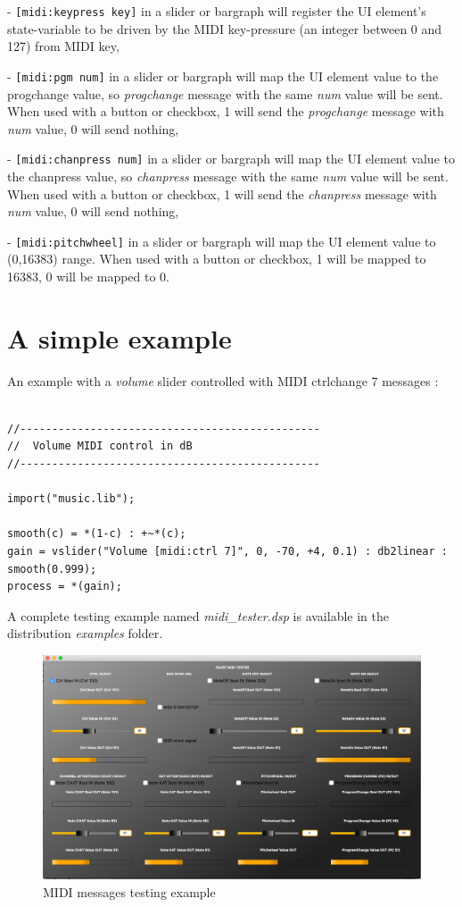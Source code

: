 - \lstinline'[midi:keypress key]' in a slider or bargraph will
register the UI element's state-variable to be driven by the MIDI
key-pressure (an integer between 0 and 127) from MIDI key,

- \lstinline'[midi:pgm num]' in a slider or bargraph will map the UI element value to the progchange value, so \emph{progchange} message with the same \emph{num} value will be sent. When used with a button or checkbox, 1 will send the \emph{progchange} message with \emph{num} value, 0 will send nothing,

- \lstinline'[midi:chanpress num]' in a slider or bargraph will map the UI element value to the chanpress value, so \emph{chanpress} message with the same \emph{num} value will be sent. When used with a button or checkbox, 1 will send the \emph{chanpress} message with \emph{num} value, 0 will send nothing,

- \lstinline'[midi:pitchwheel]' in a slider or bargraph will map the UI element value to (0,16383) range. When used with a button or checkbox, 1 will be mapped to 16383, 0 will be mapped to 0.

\section{A simple example}

An example with a \emph{volume} slider controlled with MIDI ctrlchange 7 messages :

\begin{lstlisting}

//-----------------------------------------------
//  Volume MIDI control in dB
//-----------------------------------------------

import("music.lib");

smooth(c) = *(1-c) : +~*(c);
gain = vslider("Volume [midi:ctrl 7]", 0, -70, +4, 0.1) : db2linear : smooth(0.999);
process = *(gain);

\end{lstlisting}

A complete testing example named  \emph{midi\_tester.dsp}  is available in the \faust distribution \emph{examples} folder.

\begin{figure}[h!]
  \centering
  \includegraphics[width=\textwidth]{images/midi-tester.png}
  \caption{MIDI messages testing example}   
  \label{fig:midi-tester}
\end{figure}

